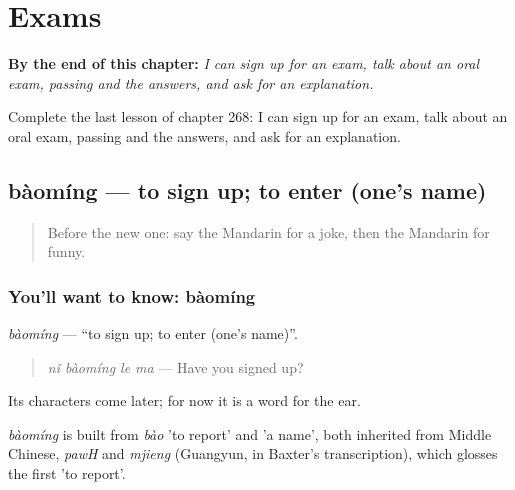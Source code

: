 
\chapter{Exams}
\label{ch:zh-exams}

\begin{chapteropening}
\textbf{By the end of this chapter:} \emph{I can sign up for an exam, talk about an oral exam, passing and the answers, and ask for an explanation.}

Complete the last lesson of chapter 268: I can sign up for an exam, talk about an oral exam, passing and the answers, and ask for an explanation.
\end{chapteropening}

\section[bàomíng]{bàomíng — to sign up; to enter (one's name)}

\label{lesson:ZH-C268-baoming}



\begin{quote}
Before the new one: say the Mandarin for a joke, then the Mandarin for funny.
\end{quote}

\subsection*{You'll want to know: bàomíng}
\emph{bàomíng} — \textquotedblleft{}to sign up; to enter (one's name)\textquotedblright{}.

\begin{quote}
\emph{nǐ bàomíng le ma} — Have you signed up?
\end{quote}

Its characters come later; for now it is a word for the ear.

\begin{cousinweb}
\emph{bàomíng} is built from \emph{bào} 'to report' and  'a name', both inherited from Middle Chinese, \emph{pawH} and \emph{mjieng} (Guangyun, in Baxter's transcription), which glosses the first 'to report'.
\end{cousinweb}

